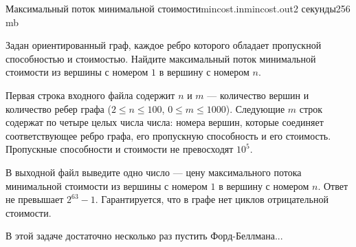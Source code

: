 \begin{problem}{Максимальный поток минимальной стоимости}{mincost.in}{mincost.out}{2 секунды}{256 mb}

Задан ориентированный граф, каждое ребро которого обладает пропускной способностью и стоимостью.
Найдите максимальный поток минимальной стоимости  из вершины с номером  $1$ в вершину с номером $n$.

\InputFile

Первая строка входного файла содержит $n$ и $m$ --- количество
вершин и количество ребер графа ($2 \le n \le 100$,
$0 \le m \le 1000$). 
Следующие $m$ строк содержат по четыре целых числа числа:
номера вершин, которые соединяет соответствующее ребро графа, 
его пропускную способность и его стоимость.
Пропускные способности и стоимости не превосходят $10^5$.

\OutputFile

В выходной файл выведите одно число --- 
цену максимального потока минимальной стоимости  из вершины с номером  $1$ в вершину с номером $n$.
Ответ не превышает $2^{63} - 1$. Гарантируется, что в графе нет циклов отрицательной стоимости.

\Examples

\begin{example}
%
\end{example}

\Hint 

В этой задаче достаточно несколько раз пустить Форд-Беллмана...

\end{problem}
